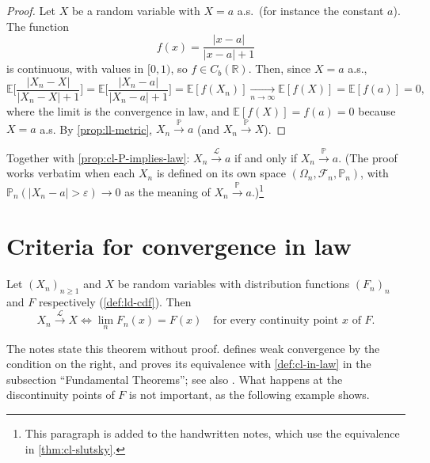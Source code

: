 \begin{proof}
Let $X$ be a random variable with $X=a$ a.s.\ (for instance the constant $a$). The function
\[
  f(x)=\frac{|x-a|}{|x-a|+1}
\]
is continuous, with values in $[0,1)$, so $f\in C_b(\mathbb R)$. Then, since $X=a$ a.s.,
\[
  \mathbb E\bigg[\frac{|X_n-X|}{|X_n-X|+1}\bigg]=\mathbb E\bigg[\frac{|X_n-a|}{|X_n-a|+1}\bigg]
  =\mathbb E[f(X_n)]\xrightarrow[n\to\infty]{}\mathbb E[f(X)]=\mathbb E[f(a)]=0,
\]
where the limit is the convergence in law, and $\mathbb E[f(X)]=f(a)=0$ because $X=a$ a.s. By
\cref{prop:ll-metric}, $X_n\xrightarrow{\mathbb P}a$ (and $X_n\xrightarrow{\mathbb P}X$).
\end{proof}

Together with \cref{prop:cl-P-implies-law}: $X_n\xrightarrow{\mathcal L}a$ if and only if
$X_n\xrightarrow{\mathbb P}a$. (The proof works verbatim when each $X_n$ is defined on its own
space $(\Omega_n,\mathcal F_n,\mathbb P_n)$, with $\mathbb P_n(|X_n-a|>\varepsilon)\to0$ as the
meaning of $X_n\xrightarrow{\mathbb P}a$.)\footnote{This paragraph is added to the handwritten
notes, which use the equivalence in \cref{thm:cl-slutsky}.}

\section{Criteria for convergence in law}\label{sec:cl-criteria}

\begin{theorem}\label{thm:cl-cdf-criterion}
Let $(X_n)_{n\ge1}$ and $X$ be random variables with distribution functions $(F_n)_n$ and $F$
respectively (\cref{def:ld-cdf}). Then
\[
  X_n\xrightarrow{\mathcal L}X\iff\lim_nF_n(x)=F(x)\quad\text{for every continuity point }x\text{ of }F .
\]
\end{theorem}

The notes state this theorem without proof. \citet[Section~25]{billingsley} defines weak
convergence by the condition on the right, and proves its equivalence with
\cref{def:cl-in-law} in the subsection ``Fundamental Theorems''; see also
\citet[Section~3.2]{durrett}. What happens at the discontinuity points of $F$ is not important,
as the following example shows.

